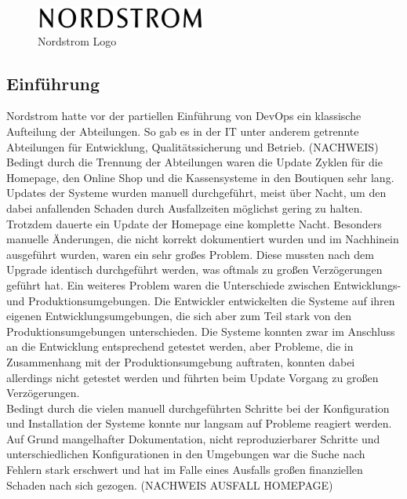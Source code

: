 \begin{figure}[ht]
  \centering
  \includegraphics[width=0.5\textwidth]{img/nordstrom_logo.png}
  \caption{Nordstrom Logo \parencite[][]{Nordstrom:2016}}
  \label{fig:scrummodell}
\end{figure}

\subsection{Einführung}
Nordstrom hatte vor der partiellen Einführung von DevOps ein klassische Aufteilung der Abteilungen. So gab es in der IT unter anderem getrennte Abteilungen für Entwicklung, Qualitätssicherung und Betrieb. (NACHWEIS) Bedingt durch die Trennung der Abteilungen waren die Update Zyklen für die Homepage, den Online Shop und die Kassensysteme in den Boutiquen sehr lang. Updates der Systeme wurden manuell durchgeführt, meist über Nacht, um den dabei anfallenden Schaden durch Ausfallzeiten möglichst gering zu halten. Trotzdem dauerte ein Update der Homepage eine komplette Nacht. Besonders manuelle Änderungen, die nicht korrekt dokumentiert wurden und im Nachhinein ausgeführt wurden, waren ein sehr großes Problem. Diese mussten nach dem Upgrade identisch durchgeführt werden, was oftmals zu großen Verzögerungen geführt hat. Ein weiteres Problem waren die Unterschiede zwischen Entwicklungs- und Produktionsumgebungen. Die Entwickler entwickelten die Systeme auf ihren eigenen Entwicklungsumgebungen, die sich aber zum Teil stark von den Produktionsumgebungen unterschieden. Die Systeme konnten zwar im Anschluss an die Entwicklung entsprechend getestet werden, aber Probleme, die in Zusammenhang mit der Produktionsumgebung auftraten, konnten dabei allerdings nicht getestet werden und führten beim Update Vorgang zu großen Verzögerungen.\\
Bedingt durch die vielen manuell durchgeführten Schritte bei der Konfiguration und Installation der Systeme konnte nur langsam auf Probleme reagiert werden. Auf Grund mangelhafter Dokumentation, nicht reproduzierbarer Schritte und unterschiedlichen Konfigurationen in den Umgebungen war die Suche nach Fehlern stark erschwert und hat im Falle eines Ausfalls großen finanziellen Schaden nach sich gezogen. (NACHWEIS AUSFALL HOMEPAGE)

